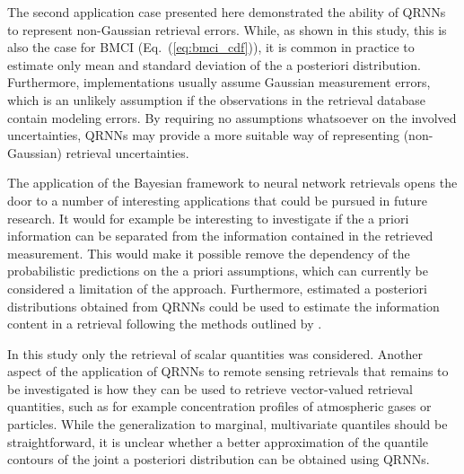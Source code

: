\documentclass[journal abbreviation, manuscript]{copernicus}
\begin{document}
The second application case presented here demonstrated the ability of QRNNs to represent
non-Gaussian retrieval errors. While, as shown in this study, this is also the case
for BMCI (Eq.~(\ref{eq:bmci_cdf})), it is common in practice to estimate only mean and standard
deviation of the a posteriori distribution. Furthermore, implementations usually
assume Gaussian measurement errors, which is an unlikely assumption if the
observations in the retrieval database contain modeling errors. By requiring no
assumptions whatsoever on the involved uncertainties, QRNNs may provide a more
suitable way of representing (non-Gaussian) retrieval uncertainties.

The application of the Bayesian framework to neural network retrievals opens the
door to a number of interesting applications that could be pursued in future
research. It would for example be interesting to investigate if the a priori
information can be separated from the information contained in the retrieved
measurement. This would make it possible remove the dependency of the
probabilistic predictions on the a priori assumptions, which can currently be
considered a limitation of the approach. Furthermore, estimated a posteriori
distributions obtained from QRNNs could be used to estimate the information
content in a retrieval following the methods outlined by \citet{rodgers}.

In this study only the retrieval of scalar quantities was considered. Another
aspect of the application of QRNNs to remote sensing retrievals that remains to
be investigated is how they can be used to retrieve vector-valued retrieval
quantities, such as for example concentration profiles of atmospheric gases or
particles. While the generalization to marginal, multivariate quantiles should
be straightforward, it is unclear whether a better approximation of the
quantile contours of the joint a posteriori distribution can be obtained using
QRNNs.



\end{document}
